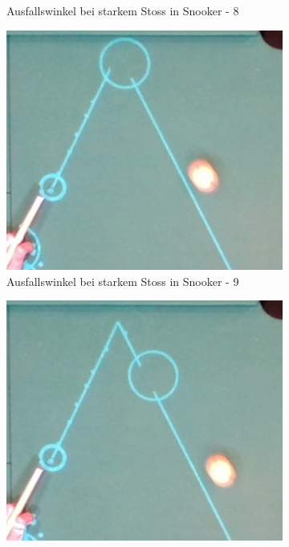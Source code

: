 \begin{figure}[h!]
\begin{subfigure}[b]{0.2\textwidth}
        \caption{Ausfallswinkel bei starkem Stoss in Snooker - 8}
        \label{fig:rebound_angle_fast_snooker_8}
    \end{subfigure}
    \hfill
    \begin{subfigure}[b]{0.2\textwidth}
        \centering
        \includegraphics[width=1.0\linewidth]{../common/04_results/resources/simulation/rebound_angle_fast_snooker/00_rail_rebound_angle_fast_snooker_09.png}
        \caption{Ausfallswinkel bei starkem Stoss in Snooker - 9}
        \label{fig:rebound_angle_fast_snooker_9}
    \end{subfigure}
    \hfill
    \begin{subfigure}[b]{0.2\textwidth}
        \centering
        \includegraphics[width=1.0\linewidth]{../common/04_results/resources/simulation/rebound_angle_fast_snooker/00_rail_rebound_angle_fast_snooker_10.png}

\end{subfigure}
\end{figure}
